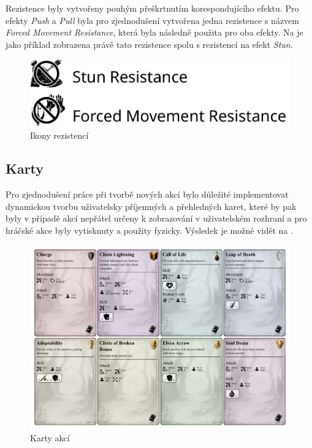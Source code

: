 Rezistence byly vytvořeny pouhým přeškrtnutím korespondujícího efektu. Pro efekty \textit{Push} a \textit{Pull} byla pro zjednodušení vytvořena jedna rezistence s názvem \textit{Forced Movement Resistance}, která byla následně použita pro oba efekty. Na  je jako příklad zobrazena právě tato rezistence spolu s rezistencí na efekt \textit{Stun}.

\begin{figure}[H]
    \centering
    \includegraphics[scale=0.7]{figures/images/resistances.pdf}
    \caption{Ikony rezistencí}
    \label{fig:resistances}
\end{figure}

\subsection{Karty}
\label{subsec:cards}

Pro zjednodušení práce při tvorbě nových akcí bylo důležité implementovat dynamickou tvorbu uživatelsky příjemných a přehledných karet, které by pak byly v případě akcí nepřátel určeny k zobrazování v uživatelském rozhraní a pro hráčské akce byly vytisknuty a použity fyzicky. Výsledek je možné vidět na .

\begin{figure}[H]
    \centering
    \includegraphics[width=\textwidth]{figures/images/cards.pdf}
    \caption{Karty akcí}
    \label{fig:cards}
\end{figure}
\newpage

